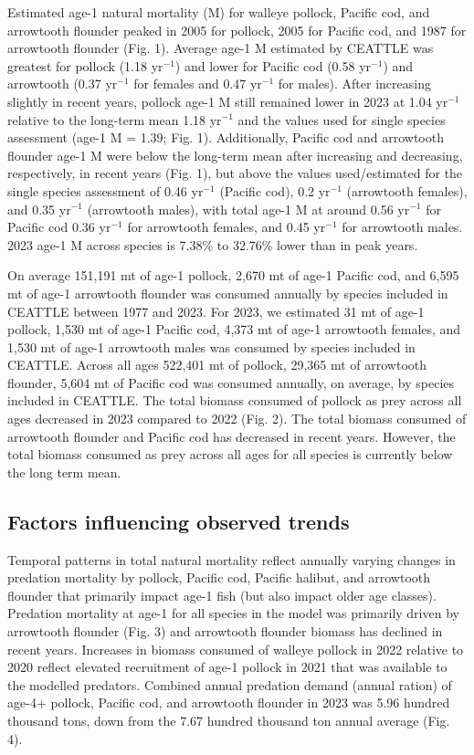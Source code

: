\documentclass[
]{article}
\begin{document}
Estimated age-1 natural mortality (M) for walleye pollock, Pacific cod,
and arrowtooth flounder peaked in 2005 for pollock, 2005 for Pacific
cod, and 1987 for arrowtooth flounder (Fig. 1). Average age-1 M
estimated by CEATTLE was greatest for pollock (1.18 yr\(^{-1}\)) and
lower for Pacific cod (0.58 yr\(^{-1}\)) and arrowtooth (0.37
yr\(^{-1}\) for females and 0.47 yr\(^{-1}\) for males). After
increasing slightly in recent years, pollock age-1 M still remained
lower in 2023 at 1.04 yr\(^{-1}\) relative to the long-term mean 1.18
yr\(^{-1}\) and the values used for single species assessment (age-1 M =
1.39; Fig. 1). Additionally, Pacific cod and arrowtooth flounder age-1 M
were below the long-term mean after increasing and decreasing,
respectively, in recent years (Fig. 1), but above the values
used/estimated for the single species assessment of 0.46 yr\(^{-1}\)
(Pacific cod), 0.2 yr\(^{-1}\) (arrowtooth females), and 0.35
yr\(^{-1}\) (arrowtooth males), with total age-1 M at around 0.56
yr\(^{-1}\) for Pacific cod 0.36 yr\(^{-1}\) for arrowtooth females, and
0.45 yr\(^{-1}\) for arrowtooth males. 2023 age-1 M across species is
7.38\% to 32.76\% lower than in peak years.

On average 151,191 mt of age-1 pollock, 2,670 mt of age-1 Pacific cod,
and 6,595 mt of age-1 arrowtooth flounder was consumed annually by
species included in CEATTLE between 1977 and 2023. For 2023, we
estimated 31 mt of age-1 pollock, 1,530 mt of age-1 Pacific cod, 4,373
mt of age-1 arrowtooth females, and 1,530 mt of age-1 arrowtooth males
was consumed by species included in CEATTLE. Across all ages 522,401 mt
of pollock, 29,365 mt of arrowtooth flounder, 5,604 mt of Pacific cod
was consumed annually, on average, by species included in CEATTLE. The
total biomass consumed of pollock as prey across all ages decreased in
2023 compared to 2022 (Fig. 2). The total biomass consumed of arrowtooth
flounder and Pacific cod has decreased in recent years. However, the
total biomass consumed as prey across all ages for all species is
currently below the long term mean.

\hypertarget{factors-influencing-observed-trends}{%
\subsection{Factors influencing observed
trends}\label{factors-influencing-observed-trends}}

Temporal patterns in total natural mortality reflect annually varying
changes in predation mortality by pollock, Pacific cod, Pacific halibut,
and arrowtooth flounder that primarily impact age-1 fish (but also
impact older age classes). Predation mortality at age-1 for all species
in the model was primarily driven by arrowtooth flounder (Fig. 3) and
arrowtooth flounder biomass has declined in recent years. Increases in
biomass consumed of walleye pollock in 2022 relative to 2020 reflect
elevated recruitment of age-1 pollock in 2021 that was available to the
modelled predators. Combined annual predation demand (annual ration) of
age-4+ pollock, Pacific cod, and arrowtooth flounder in 2023 was 5.96
hundred thousand tons, down from the 7.67 hundred thousand ton annual
average (Fig. 4).
\end{document}
